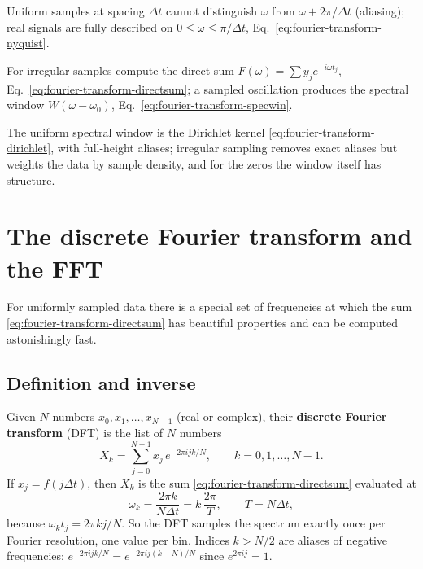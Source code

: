 \begin{keyideas}

\item Uniform samples at spacing $\Delta t$ cannot distinguish $\omega$ from $\omega+2\pi/\Delta t$ (aliasing); real signals are fully described on $0\le\omega\le\pi/\Delta t$, Eq.~\eqref{eq:fourier-transform-nyquist}.
\item For irregular samples compute the direct sum $F(\omega)=\sum y_je^{-i\omega t_j}$, Eq.~\eqref{eq:fourier-transform-directsum}; a sampled oscillation produces the spectral window $W(\omega-\omega_0)$, Eq.~\eqref{eq:fourier-transform-specwin}.
\item The uniform spectral window is the Dirichlet kernel \eqref{eq:fourier-transform-dirichlet}, with full-height aliases; irregular sampling removes exact aliases but weights the data by sample density, and for the zeros the window itself has structure.

\end{keyideas}

\section{The discrete Fourier transform and the FFT}\label{sec:fourier-transform-dft}

For uniformly sampled data there is a special set of frequencies at which the sum \eqref{eq:fourier-transform-directsum} has beautiful properties and can be computed astonishingly fast.

\subsection{Definition and inverse}

Given $N$ numbers $x_0,x_1,\dots,x_{N-1}$ (real or complex), their \textbf{discrete Fourier transform} (DFT) is the list of $N$ numbers
\begin{equation}
X_k=\sum_{j=0}^{N-1}x_j\,e^{-2\pi ijk/N},\qquad k=0,1,\dots,N-1.
\label{eq:fourier-transform-dft}
\end{equation}
If $x_j=f(j\Delta t)$, then $X_k$ is the sum \eqref{eq:fourier-transform-directsum} evaluated at
\begin{equation}
\omega_k=\frac{2\pi k}{N\Delta t}=k\,\frac{2\pi}{T},\qquad T=N\Delta t,
\end{equation}
because $\omega_kt_j=2\pi kj/N$. So the DFT samples the spectrum exactly once per Fourier resolution, one value per bin. Indices $k>N/2$ are aliases of negative frequencies: $e^{-2\pi ijk/N}=e^{-2\pi ij(k-N)/N}$ since $e^{2\pi ij}=1$.

